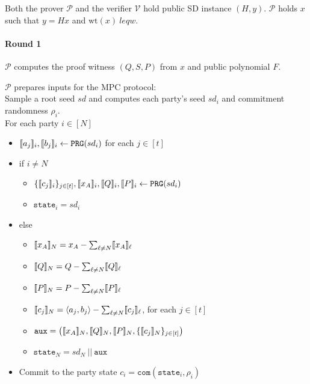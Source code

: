 \documentclass[11pt]{report}
\theoremstyle{definition}
\theoremstyle{plain}
\begin{document}
\begin{protocol}\label{def:sdith-zkpok}
  Both the prover $\mathcal{P}$ and the verifier $\mathcal{V}$ hold public SD instance $(H,y)$. $\mathcal{P}$ holds $x$ such that $y = Hx$ and $\text{wt}(x)\ leq w$.

  \paragraph{Round 1} $\mathcal{P}$ computes the proof witness $(Q, S, P)$ from $x$ and public polynomial $F$.

  $\mathcal{P}$ prepares inputs for the MPC protocol: \\
  Sample a root seed $sd$ and computes each party's seed $sd_i$ and commitment randomness $\rho_i$.\\

  \noindent
  For each party $i \in [N]$
  \begin{itemize}[parsep=0pt, itemsep=0pt]
    \item $\llbracket a_j \rrbracket_i, \llbracket b_j \rrbracket_i \leftarrow \texttt{PRG}(sd_i)$ for each $j \in [t]$
    \item if $i \neq N$
          \begin{itemize}
            \item $\{ \llbracket c_j \rrbracket_i \}_{j \in [t]}, \llbracket x_A \rrbracket_i, \llbracket Q \rrbracket_i, \llbracket P \rrbracket_i \leftarrow \texttt{PRG}(sd_i)$
            \item $\texttt{state}_i = sd_i$
          \end{itemize}
    \item else
          \begin{itemize}
            \item \( \llbracket x_A \rrbracket_N = x_A - \sum_{\ell \neq N} \llbracket x_A \rrbracket_\ell \)
            \item \( \llbracket Q \rrbracket_N = Q - \sum_{\ell \neq N} \llbracket Q \rrbracket_\ell \)
            \item \( \llbracket P \rrbracket_N = P - \sum_{\ell \neq N} \llbracket P \rrbracket_\ell \)
            \item \( \llbracket c_j \rrbracket_N = \langle a_j, b_j \rangle - \sum_{\ell \neq N} \llbracket c_j \rrbracket_\ell \), for each \( j \in [t] \)
            \item \(\texttt{aux} = \left( \llbracket x_A \rrbracket_N, \llbracket Q \rrbracket_N, \llbracket P \rrbracket_N, \{ \llbracket c_j \rrbracket_N \}_{j \in [t]} \right)\)
            \item $\texttt{state}_N = sd_N\ ||\ \texttt{aux}$
          \end{itemize}
    \item Commit to the party state $c_i = \texttt{com}(\texttt{state}_i, \rho_i)$
  \end{itemize}


\end{protocol}
\end{document}
